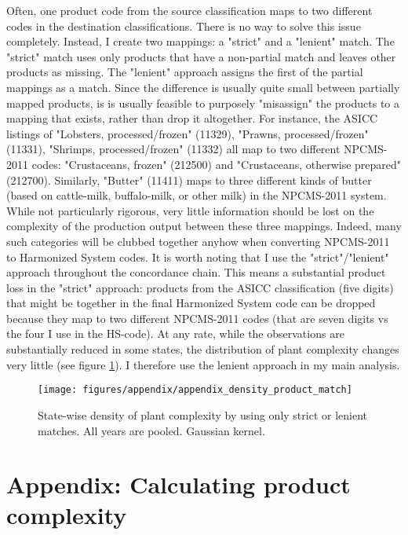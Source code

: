 \documentclass[11pt]{article}
\begin{document}
\begin{appendices}
Often, one product code from the source classification maps to two different codes in the destination classifications. There is no way to solve this issue completely. Instead, I create two mappings: a "strict" and a "lenient" match. The "strict" match uses only products that have a non-partial match and leaves other products as missing. The "lenient" approach assigns the first of the partial mappings as a match. Since the difference is usually quite small between partially mapped products, is is usually feasible to purposely "misassign" the products to a mapping that exists, rather than drop it altogether. For instance, the ASICC listings of "Lobsters, processed/frozen" (11329), "Prawns, processed/frozen" (11331), "Shrimps, processed/frozen" (11332) all map to two different NPCMS-2011 codes: "Crustaceans, frozen" (212500) and "Crustaceans, otherwise prepared" (212700). Similarly, "Butter" (11411) maps to three different kinds of butter (based on cattle-milk, buffalo-milk, or other milk) in the NPCMS-2011 system. While not particularly rigorous, very little information should be lost on the complexity of the production output between these three mappings. Indeed, many such categories will be clubbed together anyhow when converting NPCMS-2011 to Harmonized System codes. It is worth noting that I use the "strict"/"lenient" approach throughout the concordance chain. This means a substantial product loss in the "strict" approach: products from the ASICC classification (five digits) that might be together in the final Harmonized System code can be dropped because they map to two different NPCMS-2011 codes (that are seven digits vs the four I use in the HS-code). At any rate, while the observations are substantially reduced in some states, the distribution of plant complexity changes very little (see figure \ref{fig:density_product_match}). I therefore use the lenient approach in my main analysis.

\begin{figure}[htpb]
	\centering
	\texttt{[image: figures/appendix/appendix\_density\_product\_match]}
	\caption[State-wise density of plant-complexity by strict or lenient product matching]{State-wise density of plant complexity by using only strict or lenient matches. All years are pooled. Gaussian kernel.}%
	\label{fig:density_product_match}
\end{figure}

\newpage

\section{Appendix: Calculating product complexity}%
\label{sub:economic_complexity_appendix}


\end{appendices}
\end{document}
